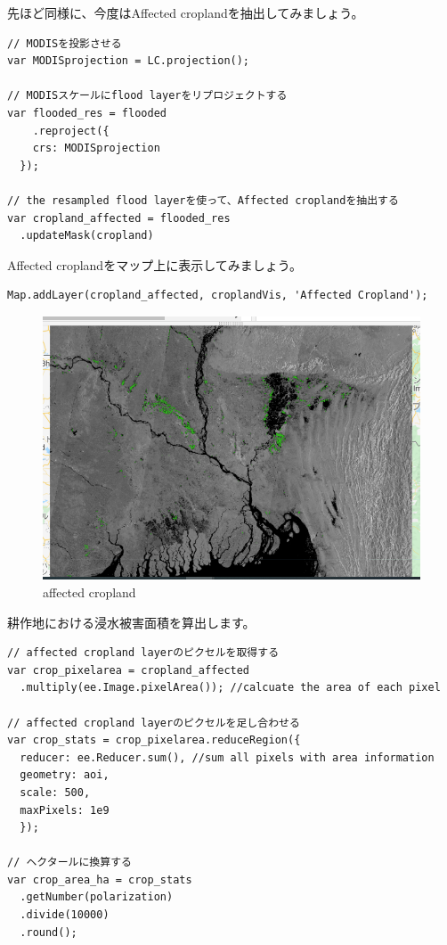 \documentclass[
]{book}
\begin{document}
先ほど同様に、今度はAffected croplandを抽出してみましょう。

\begin{verbatim}
// MODISを投影させる
var MODISprojection = LC.projection();

// MODISスケールにflood layerをリプロジェクトする
var flooded_res = flooded
    .reproject({
    crs: MODISprojection
  });

// the resampled flood layerを使って、Affected croplandを抽出する
var cropland_affected = flooded_res
  .updateMask(cropland)
\end{verbatim}

Affected croplandをマップ上に表示してみましょう。

\begin{verbatim}
Map.addLayer(cropland_affected, croplandVis, 'Affected Cropland');
\end{verbatim}

\begin{figure}
\centering
\includegraphics{images/affected cropland.png}
\caption{affected cropland}
\end{figure}

耕作地における浸水被害面積を算出します。

\begin{verbatim}
// affected cropland layerのピクセルを取得する
var crop_pixelarea = cropland_affected
  .multiply(ee.Image.pixelArea()); //calcuate the area of each pixel 

// affected cropland layerのピクセルを足し合わせる
var crop_stats = crop_pixelarea.reduceRegion({
  reducer: ee.Reducer.sum(), //sum all pixels with area information                
  geometry: aoi,
  scale: 500,
  maxPixels: 1e9
  });
  
// ヘクタールに換算する
var crop_area_ha = crop_stats
  .getNumber(polarization)
  .divide(10000)
  .round();
\end{verbatim}
\end{document}
